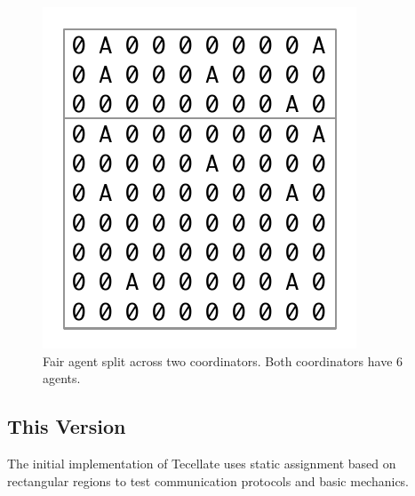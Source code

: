 \begin{figure}
    \begin{center}
        \includegraphics[scale=0.5]{figures/assign_split.pdf}
    \end{center}
    \caption{Fair agent split across two coordinators. Both coordinators have 6 agents.}
    \label{dynamic}
\end{figure}

\subsection{This Version}

The initial implementation of Tecellate uses static assignment based on rectangular regions to test communication protocols and basic mechanics. 
